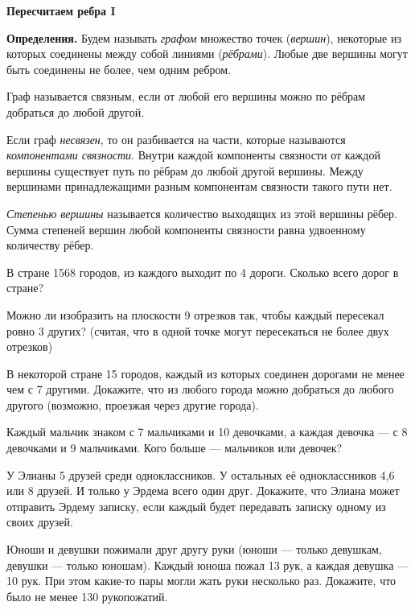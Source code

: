 \centerline{\bf \Huge Пересчитаем ребра I}

\begin{flushright}
        \scriptsize{}
\end{flushright}

\textbf{Определения.}
Будем называть \textit{графом} множество точек (\textit{вершин}), некоторые из которых соединены между собой линиями (\textit{рёбрами}). Любые две вершины могут быть соединены не более, чем одним ребром.

Граф называется связным, если от любой его вершины можно по рёбрам добраться до любой другой.

Если граф \textit{несвязен}, то он разбивается на части, которые называются \textit{компонентами связности}. Внутри каждой компоненты связности от каждой вершины существует путь по рёбрам до любой другой вершины. Между вершинами принадлежащими разным компонентам связности такого пути нет.

\textit{Степенью вершины} называется количество выходящих из этой вершины рёбер. Сумма степеней вершин любой компоненты связности равна удвоенному количеству рёбер.

В стране 1568 городов, из каждого выходит по 4 дороги. Сколько всего дорог в стране?

Можно ли изобразить на плоскости 9 отрезков так, чтобы каждый пересекал ровно 3 других? (считая, что в одной точке могут пересекаться не более двух отрезков)

В некоторой стране 15 городов, каждый из которых соединен дорогами не менее чем с 7 другими. Докажите, что из любого города можно добраться до любого другого (возможно, проезжая через другие города).

Каждый мальчик знаком с 7 мальчиками и 10 девочками, а каждая девочка — с 8 девочками и 9 мальчиками. Кого больше — мальчиков или девочек?

У Элианы 5 друзей среди одноклассников. У остальных её одноклассников 4,6 или 8 друзей. И только у Эрдема всего один друг. Докажите, что Элиана может отправить Эрдему записку, если каждый будет передавать записку одному из своих друзей.

Юноши и девушки пожимали друг другу руки (юноши — только девушкам, девушки — только юношам). Каждый юноша пожал 13 рук, а каждая девушка — 10 рук. При этом какие-то пары могли жать руки несколько раз. Докажите, что было не менее 130 рукопожатий.